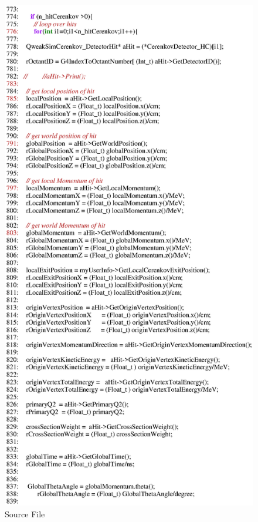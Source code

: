 \begin{figure}[h]
  \hspace{0cm}
  \includegraphics[scale=0.8]{./figures13/QweakSimEventAction.cc-p14.eps}
  \caption{Source File}
           \label{fig:XIII-SC-29}
\end{figure}

